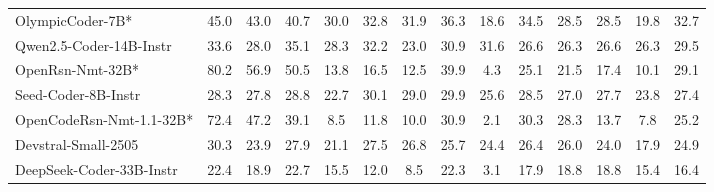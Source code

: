 \begin{table}[hbt]
{\begin{tabular}{l *{13}{c}}
\rowcolor{gray!10}
OlympicCoder-7B*           & 45.0 & 43.0 & 40.7 & 30.0 & 32.8 & 31.9 & 36.3 & 18.6 & 34.5 & 28.5 & 28.5 & 19.8 & 32.7 \\
Qwen2.5-Coder-14B-Instr        & 33.6 & 28.0 & 35.1 & 28.3 & 32.2 & 23.0 & 30.9 & 31.6 & 26.6 & 26.3 & 26.6 & 26.3 & 29.5 \\
\rowcolor{gray!10}
OpenRsn-Nmt-32B*      & 80.2 & 56.9 & 50.5 & 13.8 & 16.5 & 12.5 & 39.9 & 4.3  & 25.1 & 21.5 & 17.4 & 10.1 & 29.1 \\
Seed-Coder-8B-Instr            & 28.3 & 27.8 & 28.8 & 22.7 & 30.1 & 29.0 & 29.9 & 25.6 & 28.5 & 27.0 & 27.7 & 23.8 & 27.4 \\
\rowcolor{gray!10}
OpenCodeRsn-Nmt-1.1-32B* & 72.4 & 47.2 & 39.1 & 8.5  & 11.8 & 10.0 & 30.9 & 2.1  & 30.3 & 28.3 & 13.7 & 7.8  & 25.2 \\
Devstral-Small-2505            & 30.3 & 23.9 & 27.9 & 21.1 & 27.5 & 26.8 & 25.7 & 24.4 & 26.4 & 26.0 & 24.0 & 17.9 & 24.9 \\
\rowcolor{gray!10}
DeepSeek-Coder-33B-Instr       & 22.4 & 18.9 & 22.7 & 15.5 & 12.0 & 8.5  & 22.3 & 3.1  & 17.9 & 18.8 & 18.8 & 15.4 & 16.4 \\
\bottomrule
\end{tabular}%
}
\end{table}